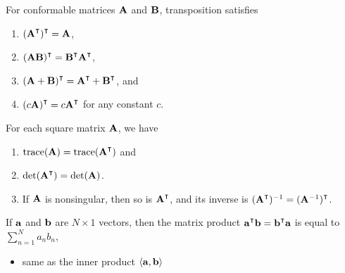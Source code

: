 \begin{frame}
    
    \vspace{2em}
    \Fact{\eqref{ET-fa:owtra}}
    For conformable matrices $\mathbf A$ and $\mathbf B$, transposition satisfies
    \begin{enumerate}
        \item $(\boldA^\T)^\T = \boldA$,
        \item $(\boldA \boldB)^\T = \boldB^\T \boldA^\T$,
        \item $(\boldA + \boldB)^\T = \boldA^\T +  \boldB^\T$, and
        \item $(c \boldA)^\T = c \boldA^\T$ for any constant $c$.
    \end{enumerate}

\end{frame}

\begin{frame}

    \vspace{2em}
    \Fact{\eqref{ET-fa:owtra2}}
        For each square matrix $\mathbf A$, we have 
        \begin{enumerate}
            \item $\trace(\boldA) = \trace(\boldA^\T)$ and
            \item $\det(\boldA^\T) = \det(\boldA)$.
            \item If $\mathbf A$ is nonsingular, then so is $\boldA^\T$, and
                its inverse is $(\boldA^\T)^{-1}= (\boldA^{-1})^\T$.
        \end{enumerate}
        
    \vspace{.7em}
    If ${\mathbf a}$ and ${\mathbf b}$ are $N \times 1$ vectors, then the matrix
    product $\bolda^\T \boldb = \boldb^\T \bolda$ is equal to $\sum_{n=1}^N a_n b_n$,
    
    \begin{itemize}
        \item same as the inner product $\left\langle{ {\mathbf a} ,  {\mathbf b} }\right\rangle$
    \end{itemize}

\end{frame}


